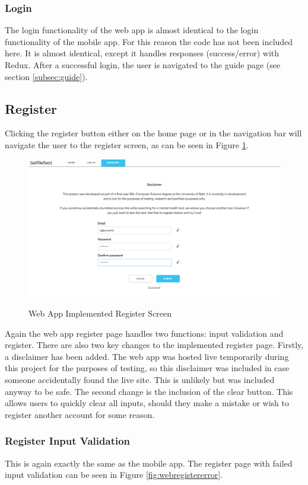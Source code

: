 \documentclass[11pt,openright,a4paper]{report}
\begin{document}
\subsubsection{Login}
The login functionality of the web app is almost identical to the login functionality of the mobile app. For this reason the code has not been included here. It is almost identical, except it handles responses (success/error) with Redux. After a successful login, the user is navigated to the guide page (see section \ref{subsec:guide}).

\subsection{Register}
Clicking the register button either on the home page or in the navigation bar will navigate the user to the register screen, as can be seen in Figure \ref{fig:webregisterimpl}.

\begin{figure}[ht]
\centering
\caption{Web App Implemented Register Screen}
\includegraphics[width=.8\textwidth]{i/webregisterimpl.png}
\label{fig:webregisterimpl}
\end{figure}

Again the web app register page handles two functions: input validation and register. There are also two key changes to the implemented register page. Firstly, a disclaimer has been added. The web app was hosted live temporarily during this project for the purposes of testing, so this disclaimer was included in case someone accidentally found the live site. This is unlikely but was included anyway to be safe. The second change is the inclusion of the clear button. This allows users to quickly clear all inputs, should they make a mistake or wish to register another account for some reason.

\newpage
\subsubsection{Register Input Validation}
This is again exactly the same as the mobile app. The register page with failed input validation can be seen in Figure \ref{fig:webregistererror}.
\end{document}
